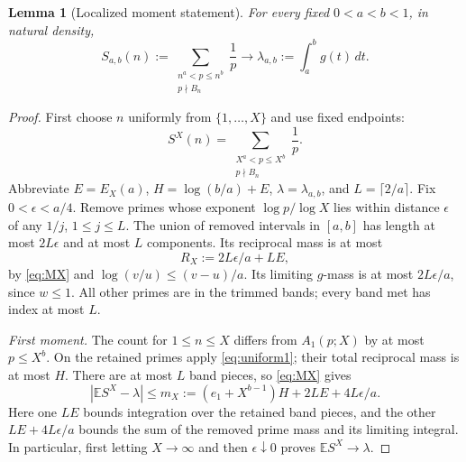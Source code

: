 \documentclass[10pt]{article}
\newtheorem{lemma}[theorem]{Lemma}
\theoremstyle{remark}
\newcommand{\E}{\mathbb E}
\begin{document}
\begin{lemma}[Localized moment statement]\label{lem:local}
For every fixed $0<a<b<1$, in natural density,
\begin{equation}\label{eq:local}\tag{LOCAL}
 S_{a,b}(n):=\sum_{\substack{n^a<p\leq n^b\\p\nmid B_n}}\frac1p
 \longrightarrow \lambda_{a,b}:=\int_a^b g(t)\,dt.
\end{equation}
\end{lemma}
\begin{proof}
First choose $n$ uniformly from $\{1,\ldots,X\}$ and use fixed endpoints:
\[
 S^X(n)=\sum_{\substack{X^a<p\leq X^b\\p\nmid B_n}}\frac1p.
\]
Abbreviate $E=E_X(a)$, $H=\log(b/a)+E$, $\lambda=\lambda_{a,b}$,
and $L=\lceil2/a\rceil$. Fix $0<\epsilon<a/4$. Remove primes whose
exponent $\log p/\log X$ lies within distance $\epsilon$ of any $1/j$,
$1\leq j\leq L$. The union of removed intervals in $[a,b]$ has length
at most $2L\epsilon$ and at most $L$ components. Its reciprocal mass is
at most
\begin{equation}\label{eq:removed}
 R_X:=2L\epsilon/a+LE,
\end{equation}
by \eqref{eq:MX} and $\log(v/u)\leq(v-u)/a$. Its limiting $g$-mass
is at most $2L\epsilon/a$, since $w\leq1$. All other primes are in
the trimmed bands; every band met has index at most $L$.

\emph{First moment.} The count for $1\leq n\leq X$ differs from
$A_1(p;X)$ by at most $p\leq X^b$. On the retained primes apply
\eqref{eq:uniform1}; their total reciprocal mass is at most $H$.
There are at most $L$ band pieces, so \eqref{eq:MX} gives
\begin{equation}\label{eq:meanerror}
 |\E S^X-\lambda|\leq
 m_X:=(e_1+X^{b-1})H+2LE+4L\epsilon/a.
\end{equation}
Here one $LE$ bounds integration over the retained band pieces,
and the other $LE+4L\epsilon/a$ bounds the sum of the removed
prime mass and its limiting integral. In particular, first letting
$X\to\infty$ and then $\epsilon\downarrow0$ proves $\E S^X\to\lambda$.


\end{proof}
\end{document}
